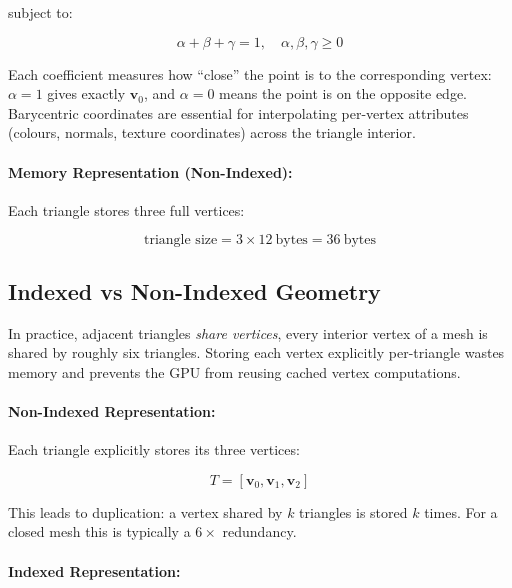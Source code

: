 \documentclass[11pt]{article}
\begin{document}
subject to:

\begin{equation}
    \alpha + \beta + \gamma = 1, \quad \alpha, \beta, \gamma \geq 0
\end{equation}

Each coefficient measures how ``close'' the point is to the corresponding vertex: $\alpha = 1$ gives exactly $\mathbf{v}_0$, and $\alpha = 0$ means the point is on the opposite edge. Barycentric coordinates are essential for interpolating per-vertex attributes (colours, normals, texture coordinates) across the triangle interior.

\paragraph{Memory Representation (Non-Indexed):}

Each triangle stores three full vertices:

\begin{equation}
    \text{triangle size} = 3 \times 12\ \text{bytes} = 36\ \text{bytes}
\end{equation}


\subsection{Indexed vs Non-Indexed Geometry}

In practice, adjacent triangles \emph{share vertices}, every interior vertex of a mesh is shared by roughly six triangles. Storing each vertex explicitly per-triangle wastes memory and prevents the GPU from reusing cached vertex computations.

\paragraph{Non-Indexed Representation:}

Each triangle explicitly stores its three vertices:

\begin{equation}
    T = [\mathbf{v}_0, \mathbf{v}_1, \mathbf{v}_2]
\end{equation}

This leads to duplication: a vertex shared by $k$ triangles is stored $k$ times. For a closed mesh this is typically a $6\times$ redundancy.

\paragraph{Indexed Representation:}
\end{document}
